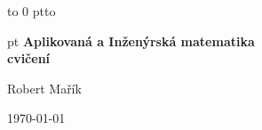 \documentclass{article}
\begin{document}
\begin{titlepage}


  {\centering 

    \vbox to 0 pt{\kern -1cm\hbox to \vss}

  }

  \begin{minipage}{\linewidth} \sffamily
{} pt
    \bfseries\centering
    \vspace*{0.5cm}
    \color{unigreen}
{\Huge Aplikovaná a Inženýrská matematika\\[20pt] cvičení}

\bigskip
  {\Large Robert Mařík}

  \bigskip
  {\today}
  
\end{minipage}
  
  
\end{titlepage}
\tableofcontents

\clearpage

\end{document}
